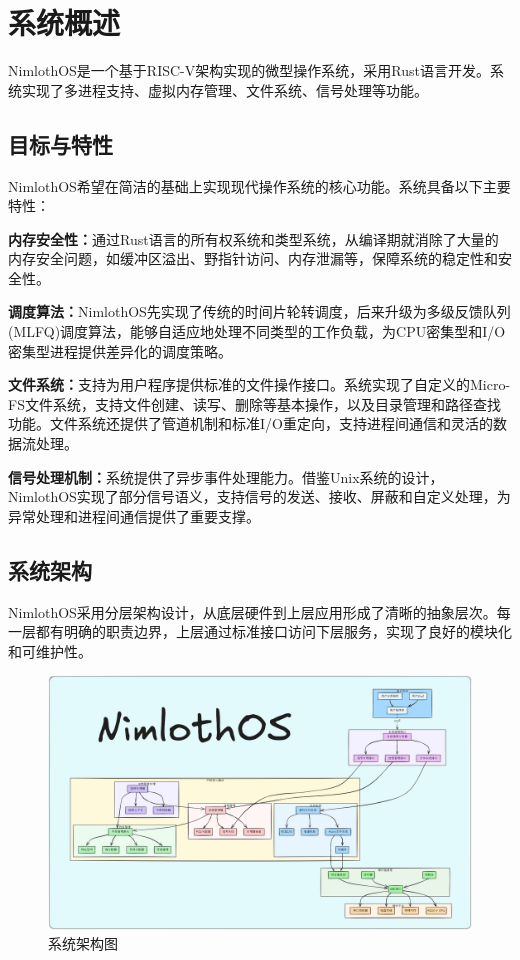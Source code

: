 \chapter{系统概述}

NimlothOS是一个基于RISC-V架构实现的微型操作系统，采用Rust语言开发。系统实现了多进程支持、虚拟内存管理、文件系统、信号处理等功能。

\section{目标与特性}

NimlothOS希望在简洁的基础上实现现代操作系统的核心功能。系统具备以下主要特性：

\textbf{内存安全性：}通过Rust语言的所有权系统和类型系统，从编译期就消除了大量的内存安全问题，如缓冲区溢出、野指针访问、内存泄漏等，保障系统的稳定性和安全性。

\textbf{调度算法：}NimlothOS先实现了传统的时间片轮转调度，后来升级为多级反馈队列(MLFQ)调度算法，能够自适应地处理不同类型的工作负载，为CPU密集型和I/O密集型进程提供差异化的调度策略。

\textbf{文件系统：}支持为用户程序提供标准的文件操作接口。系统实现了自定义的Micro-FS文件系统，支持文件创建、读写、删除等基本操作，以及目录管理和路径查找功能。文件系统还提供了管道机制和标准I/O重定向，支持进程间通信和灵活的数据流处理。

\textbf{信号处理机制：}系统提供了异步事件处理能力。借鉴Unix系统的设计，NimlothOS实现了部分信号语义，支持信号的发送、接收、屏蔽和自定义处理，为异常处理和进程间通信提供了重要支撑。

\section{系统架构}

NimlothOS采用分层架构设计，从底层硬件到上层应用形成了清晰的抽象层次。每一层都有明确的职责边界，上层通过标准接口访问下层服务，实现了良好的模块化和可维护性。

\begin{figure}[htbp]
    \centering
    \includegraphics[width=1.0\textwidth]{../image/NimlothOS.png}
    \caption{系统架构图}
    \label{fig:architecture}
\end{figure}

